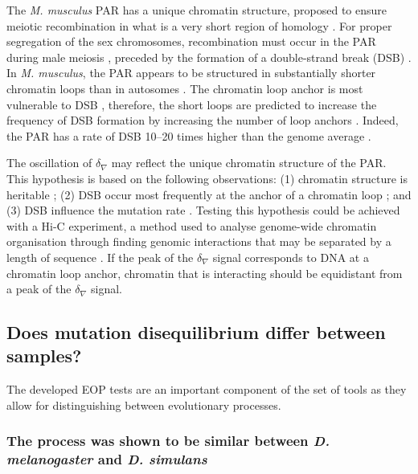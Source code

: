 The \textit{M. musculus} PAR has a unique chromatin structure, proposed to ensure meiotic recombination in what is a very short region of homology \citep{Kauppi2011DistinctMeiosis}. For proper segregation of the sex chromosomes, recombination must occur in the PAR during male meiosis \citep{Burgoyne1982GeneticMammals, Ellis1989TheRegion, Rappold1993TheChromosomes}, preceded by the formation of a double-strand break (DSB) \citep{Keeney2001MechanismInitiation}. In \textit{M. musculus}, the PAR appears to be structured in substantially shorter chromatin loops than in autosomes \citep{Kauppi2011DistinctMeiosis}. The chromatin loop anchor is most vulnerable to DSB \citep{Canela2017GenomeFragility}, therefore, the short loops are predicted to increase the frequency of DSB formation by increasing the number of loop anchors \citep{Acquaviva2020EnsuringRegion}. 
Indeed, the PAR has a rate of DSB 10--20 times higher than the genome average \citep{Kauppi2011DistinctMeiosis}. 

The oscillation of $\delta_\nabla$ may reflect the unique chromatin structure of the PAR. This hypothesis is based on the following observations: (1) chromatin structure is heritable \citep{Grewal2003HeterochromatinExpression, Beisel2011SilencingMechanisms}; (2) DSB occur most frequently at the anchor of a chromatin loop \citep{Canela2017GenomeFragility}; and (3) DSB influence the mutation rate \citep{Cannan2016MechanismsChromatin}. Testing this hypothesis could be achieved with a Hi-C experiment, a method used to analyse genome-wide chromatin organisation through finding genomic interactions that may be separated by a length of sequence \citep{Lieberman-Aiden2009ComprehensiveGenome}. If the peak of the $\delta_\nabla$ signal corresponds to DNA at a chromatin loop anchor, chromatin that is interacting should be equidistant from a peak of the $\delta_\nabla$ signal. 

\subsection{Does mutation disequilibrium differ between samples?}

The developed EOP tests are an important component of the set of tools as they allow for distinguishing between evolutionary processes. 

\subsubsection{The process was shown to be similar between \textit{D. melanogaster} and \textit{D. simulans} }

